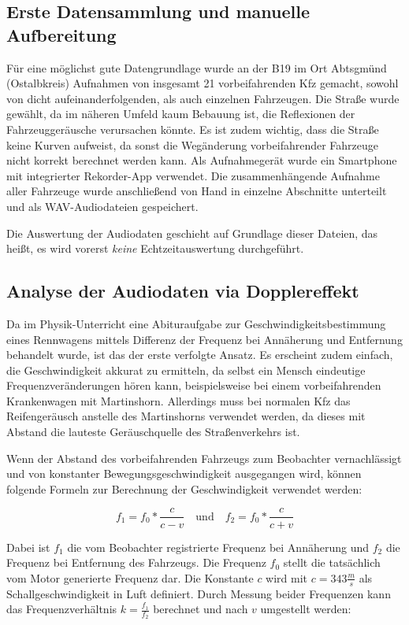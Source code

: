\subsection{Erste Datensammlung und manuelle Aufbereitung}
Für eine möglichst gute Datengrundlage wurde an der B19 im Ort Abtsgmünd (Ostalbkreis) Aufnahmen von insgesamt 21 vorbeifahrenden Kfz gemacht, sowohl von dicht aufeinanderfolgenden, als auch einzelnen Fahrzeugen. Die Straße wurde gewählt, da im näheren Umfeld kaum Bebauung ist, die Reflexionen der Fahrzeuggeräusche verursachen könnte. Es ist zudem wichtig, dass die Straße keine Kurven aufweist, da sonst die Wegänderung vorbeifahrender Fahrzeuge nicht korrekt berechnet werden kann. Als Aufnahmegerät wurde ein Smartphone mit integrierter Rekorder-App verwendet. Die zusammenhängende Aufnahme aller Fahrzeuge wurde anschließend von Hand in einzelne Abschnitte unterteilt und als WAV-Audiodateien gespeichert.

Die Auswertung der Audiodaten geschieht auf Grundlage dieser Dateien, das heißt, es wird vorerst \emph{keine} Echtzeitauswertung durchgeführt.

\subsection{Analyse der Audiodaten via Dopplereffekt}
Da im Phy\-sik-Unter\-richt eine Abituraufgabe zur Geschwindigkeitsbestimmung eines Rennwagens mittels Differenz der Frequenz bei Annäherung und Entfernung behandelt wurde, ist das der erste verfolgte Ansatz. Es erscheint zudem einfach, die Geschwindigkeit akkurat zu ermitteln, da selbst ein Mensch eindeutige Frequenzveränderungen hören kann, beispielsweise bei einem vorbeifahrenden Krankenwagen mit Martinshorn. Allerdings muss bei normalen Kfz das Reifengeräusch anstelle des Martinshorns verwendet werden, da dieses mit Abstand die lauteste Geräuschquelle des Straßenverkehrs ist.

Wenn der Abstand des vorbeifahrenden Fahrzeugs zum Beobachter vernachlässigt und von konstanter Bewegungsgeschwindigkeit ausgegangen wird, können folgende Formeln zur Berechnung der Geschwindigkeit verwendet werden:

\[
    f_{1} = f_{0} * \frac{c}{c - v}
    \quad\text{und}\quad
    f_{2} = f_{0} * \frac{c}{c + v}
\]

Dabei ist \(f_{1}\) die vom Beobachter registrierte Frequenz bei Annäherung und \(f_{2}\) die Frequenz bei Entfernung des Fahrzeugs. Die Frequenz \(f_{0}\) stellt die tatsächlich vom Motor generierte Frequenz dar. \cite{PhysikAbituraufgabe}  Die Konstante \(c\) wird mit \(c = 343\frac{m}{s}\) als Schallgeschwindigkeit in Luft definiert. Durch Messung beider Frequenzen kann das Frequenzverhältnis \(k = \frac{f_{1}}{f_{2}}\) berechnet und nach \(v\) umgestellt werden:

